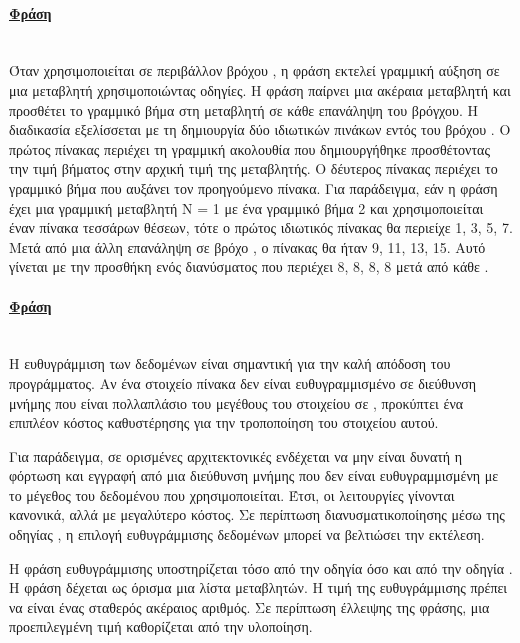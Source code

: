 \paragraph{\underline{Φράση }}
\mbox{}\\
Όταν χρησιμοποιείται σε περιβάλλον βρόχου , η φράση  εκτελεί γραμμική αύξηση σε μια μεταβλητή
χρησιμοποιώντας  οδηγίες. Η φράση  παίρνει μια ακέραια μεταβλητή και προσθέτει το γραμμικό βήμα στη
μεταβλητή σε κάθε επανάληψη του βρόγχου. Η διαδικασία εξελίσσεται με τη δημιουργία δύο ιδιωτικών πινάκων εντός του
βρόχου . Ο πρώτος πίνακας περιέχει τη γραμμική ακολουθία που δημιουργήθηκε προσθέτοντας την τιμή βήματος στην
αρχική τιμή της μεταβλητής. Ο δέυτερος πίνακας περιέχει το γραμμικό βήμα που αυξάνει τον προηγούμενο πίνακα. Για
παράδειγμα, εάν η φράση έχει μια γραμμική μεταβλητή N = 1 με ένα γραμμικό βήμα 2 και χρησιμοποιείται έναν πίνακα
τεσσάρων θέσεων, τότε ο πρώτος ιδιωτικός πίνακας θα περιείχε 1, 3, 5, 7. Μετά από μια άλλη επανάληψη σε βρόχο , ο
πίνακας θα ήταν 9, 11, 13, 15. Αυτό γίνεται με την προσθήκη ενός διανύσματος που περιέχει 8, 8, 8, 8 μετά
από κάθε \cite{simd_linear}.


\paragraph{\underline{Φράση }}
\ \\
Η ευθυγράμμιση των δεδομένων είναι σημαντική για την καλή απόδοση του προγράμματος. Αν ένα στοιχείο πίνακα δεν
είναι ευθυγραμμισμένο σε διεύθυνση μνήμης που είναι πολλαπλάσιο του μεγέθους του στοιχείου σε \emph{},
προκύπτει ένα επιπλέον κόστος καθυστέρησης για την τροποποίηση του στοιχείου αυτού.

Για παράδειγμα, σε ορισμένες αρχιτεκτονικές ενδέχεται να μην είναι δυνατή η φόρτωση και εγγραφή από μια διεύθυνση μνήμης
που δεν είναι ευθυγραμμισμένη με το μέγεθος του δεδομένου που χρησιμοποιείται. Έτσι, οι λειτουργίες γίνονται κανονικά,
αλλά με μεγαλύτερο κόστος. Σε περίπτωση διανυσματικοποίησης μέσω της οδηγίας \emph{}, η επιλογή ευθυγράμμισης
δεδομένων μπορεί να βελτιώσει την εκτέλεση.

Η φράση ευθυγράμμισης υποστηρίζεται τόσο από την οδηγία \emph{} όσο και από την οδηγία \emph{}. Η φράση δέχεται ως όρισμα μια λίστα μεταβλητών. Η τιμή της ευθυγράμμισης πρέπει να είναι ένας σταθερός ακέραιος
αριθμός. Σε περίπτωση έλλειψης της φράσης, μια προεπιλεγμένη τιμή καθορίζεται από την υλοποίηση.
\ \\
